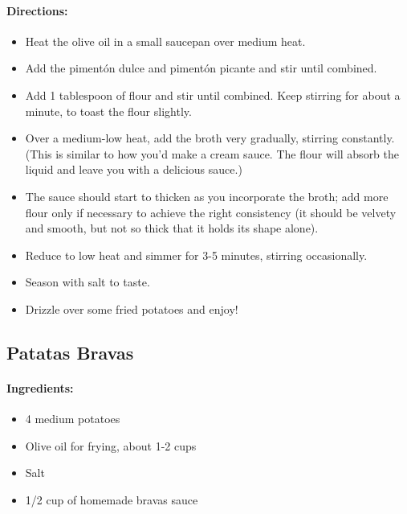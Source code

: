\documentclass{article}
\begin{document}
\paragraph{Directions:}
\begin{itemize}
	\item Heat the olive oil in a small saucepan over medium heat.
	\item Add the pimentón dulce and pimentón picante and stir until combined.
	\item Add 1 tablespoon of flour and stir until combined. Keep stirring for about a minute, to toast the flour slightly.
	\item Over a medium-low heat, add the broth very gradually, stirring constantly. (This is similar to how you'd make a cream sauce. The flour will absorb the liquid and leave you with a delicious sauce.)
	\item The sauce should start to thicken as you incorporate the broth; add more flour only if necessary to achieve the right consistency (it should be velvety and smooth, but not so thick that it holds its shape alone).
	\item Reduce to low heat and simmer for 3-5 minutes, stirring occasionally.
	\item Season with salt to taste.
	\item Drizzle over some fried potatoes and enjoy!
\end{itemize}

\subsection{Patatas Bravas}

\paragraph{Ingredients:}

\begin{itemize}
	\item 4 medium potatoes
	\item Olive oil for frying, about 1-2 cups
	\item Salt
	\item 1/2 cup of homemade bravas sauce
\end{itemize}
\end{document}
